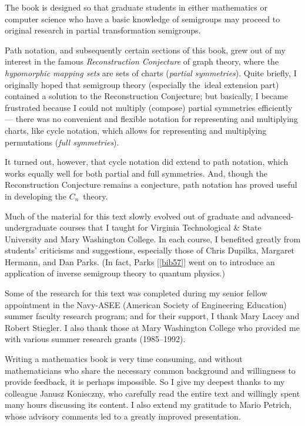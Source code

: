 \documentclass{surv-l}
\numberwithin{equation}{section}
\numberwithin{table}{section}
\numberwithin{figure}{section}
\theoremstyle{plain}
\theoremstyle{definition}
\begin{document}
The book is designed so that graduate students in either
mathematics or computer science who have a basic knowledge of
semigroups may proceed to original research in partial
transformation semigroups.

Path notation, and subsequently certain sections of this book,
grew out of my interest in the famous \emph{Reconstruction
Conjecture} of graph theory, where the \emph{hypomorphic mapping
sets} are sets of charts (\emph{partial
symmetries}). Quite briefly, I originally hoped that semigroup
theory (especially the~ideal extension part) contained a solution
to the Reconstruction Conjecture; but basically, I became
frustrated because I could not multiply (compose) partial
symmetries efficiently --- there was no convenient and flexible
notation for representing and multiplying charts, like cycle
notation, which allows for representing and multiplying
permutations (\emph{full symmetries}).

It turned out, however, that cycle notation did extend to path
notation, which works equally well for both partial and full
symmetries. And, though the Reconstruction Conjecture remains a
conjecture, path notation has proved useful in developing the
$C_{n}$~theory.

Much of the material for this text slowly evolved out of graduate
and advanced-undergraduate courses that I taught for Virginia
Technological \& State University and Mary Washington College. In
each course, I benefited greatly from students' criticisms and
suggestions, especially those of Chris Dupilka,
Margaret Hermann, and Dan Parks. (In fact, Parks
[\ref{bib57}] went on to introduce an
application of inverse semigroup theory to quantum physics.)

Some of the research for this text was completed during my senior
fellow appointment in the Navy-ASEE (American Society of
Engineering Education) summer faculty research program; and for
their support, I thank Mary Lacey and Robert
Stiegler. I also thank those at Mary
Washington College who provided me with various summer research
grants (1985--1992).

Writing a mathematics book is very time consuming, and without
mathematicians who share the necessary common background and
willingness to provide feedback, it is perhaps impossible. So I
give my deepest thanks to my colleague Janusz Konieczny, who
carefully read the entire text and willingly spent many hours
discussing its content. I also extend my gratitude to Mario
Petrich, whose advisory comments led to a greatly improved
presentation.
\end{document}
